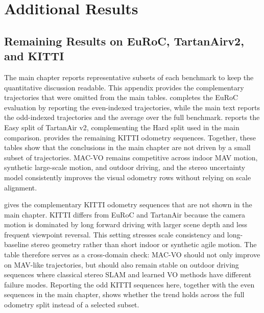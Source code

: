 
\section{Additional Results}

\subsection{Remaining Results on EuRoC, TartanAirv2, and KITTI}
\label{sec:macvo:AdditionalResults}

The main chapter reports representative subsets of each benchmark to keep the quantitative discussion readable.
This appendix provides the complementary trajectories that were omitted from the main tables.
 completes the EuRoC evaluation by reporting the even-indexed trajectories, while the main text reports the odd-indexed trajectories and the average over the full benchmark.
 reports the Easy split of TartanAir v2, complementing the Hard split used in the main comparison.
 provides the remaining KITTI odometry sequences.
Together, these tables show that the conclusions in the main chapter are not driven by a small subset of trajectories.
MAC-VO remains competitive across indoor MAV motion, synthetic large-scale motion, and outdoor driving, and the stereo uncertainty model consistently improves the visual odometry rows without relying on scale alignment.





 gives the complementary KITTI odometry sequences that are not shown in the main chapter.
KITTI differs from EuRoC and TartanAir because the camera motion is dominated by long forward driving with larger scene depth and less frequent viewpoint reversal.
This setting stresses scale consistency and long-baseline stereo geometry rather than short indoor or synthetic agile motion.
The table therefore serves as a cross-domain check: MAC-VO should not only improve on MAV-like trajectories, but should also remain stable on outdoor driving sequences where classical stereo SLAM and learned VO methods have different failure modes.
Reporting the odd KITTI sequences here, together with the even sequences in the main chapter, shows whether the trend holds across the full odometry split instead of a selected subset.



